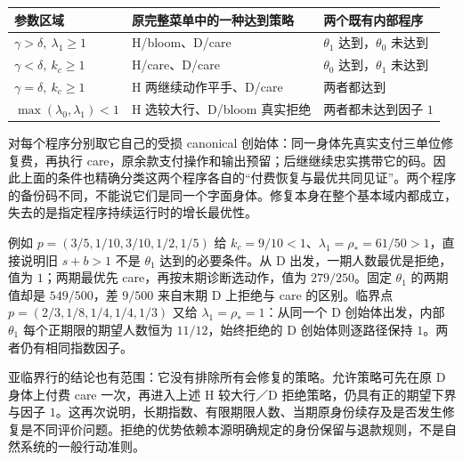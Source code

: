 \documentclass[
  11pt,
  oneside]{book}
\newcounter{none} %
\begin{document}
{\def\LTcaptype{none} %
\begin{longtable}[]{@{}
  >{\raggedright\arraybackslash}p{}
  >{\raggedright\arraybackslash}p{}
  >{\raggedright\arraybackslash}p{}@{}}
\toprule\noalign{}
\begin{minipage}[b]{\linewidth}\raggedright
参数区域
\end{minipage} & \begin{minipage}[b]{\linewidth}\raggedright
原完整菜单中的一种达到策略
\end{minipage} & \begin{minipage}[b]{\linewidth}\raggedright
两个既有内部程序
\end{minipage} \\
\midrule\noalign{}
\endhead
\bottomrule\noalign{}
\endlastfoot
\(\gamma>\delta,\ \lambda_1\ge1\) & H/bloom、D/care & \(\theta_1\) 达到，\(\theta_0\) 未达到 \\
\(\gamma<\delta,\ k_c\ge1\) & H/care、D/care & \(\theta_0\) 达到，\(\theta_1\) 未达到 \\
\(\gamma=\delta,\ k_c\ge1\) & H 两继续动作平手、D/care & 两者都达到 \\
\(\max(\lambda_0,\lambda_1)<1\) & H 选较大行、D/bloom 真实拒绝 & 两者都未达到因子 \(1\) \\
\end{longtable}
}

对每个程序分别取它自己的受损 canonical 创始体：同一身体先真实支付三单位修复费，再执行 care，原余款支付操作和输出预留；后继继续忠实携带它的码。因此上面的条件也精确分类这两个程序各自的``付费恢复与最优共同见证''。两个程序的备份码不同，不能说它们是同一个字面身体。修复本身在整个基本域内都成立，失去的是指定程序持续运行时的增长最优性。

例如 \(p=(3/5,1/10,3/10,1/2,1/5)\) 给 \(k_c=9/10<1\)、\(\lambda_1=\rho_*=61/50>1\)，直接说明旧 \(s+b>1\) 不是 \(\theta_1\) 达到的必要条件。从 D 出发，一期人数最优是拒绝，值为 \(1\)；两期最优先 care，再按末期诊断选动作，值为 \(279/250\)。固定 \(\theta_1\) 的两期值却是 \(549/500\)，差 \(9/500\) 来自末期 D 上拒绝与 care 的区别。临界点 \(p=(2/3,1/8,1/4,1/4,1/3)\) 又给 \(\lambda_1=\rho_*=1\)：从同一个 D 创始体出发，内部 \(\theta_1\) 每个正期限的期望人数恒为 \(11/12\)，始终拒绝的 D 创始体则逐路径保持 \(1\)。两者仍有相同指数因子。

亚临界行的结论也有范围：它没有排除所有会修复的策略。允许策略可先在原 D 身体上付费 care 一次，再进入上述 H 较大行／D 拒绝策略，仍具有正的期望下界与因子 \(1\)。这再次说明，长期指数、有限期限人数、当期原身份续存及是否发生修复是不同评价问题。拒绝的优势依赖本源明确规定的身份保留与退款规则，不是自然系统的一般行动准则。
\end{document}
